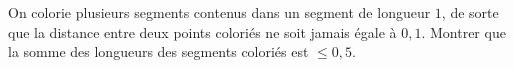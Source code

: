 On colorie plusieurs segments contenus dans un segment de longueur $1$, de sorte que la distance entre deux points coloriés ne soit jamais égale à $0{,}1$. Montrer que la somme des longueurs des segments coloriés est $\leq 0{,}5$.
